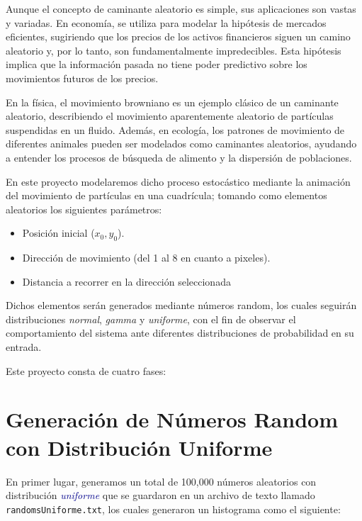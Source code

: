 \documentclass[11pt]{article} %
\begin{document}
	Aunque el concepto de caminante aleatorio es simple, sus aplicaciones son vastas y variadas. En economía, se utiliza para modelar la hipótesis de mercados eficientes, sugiriendo que los precios de los activos financieros siguen un camino aleatorio y, por lo tanto, son fundamentalmente impredecibles. Esta hipótesis implica que la información pasada no tiene poder predictivo sobre los movimientos futuros de los precios.
	
	En la física, el movimiento browniano es un ejemplo clásico de un caminante aleatorio, describiendo el movimiento aparentemente aleatorio de partículas suspendidas en un fluido. Además, en ecología, los patrones de movimiento de diferentes animales pueden ser modelados como caminantes aleatorios, ayudando a entender los procesos de búsqueda de alimento y la dispersión de poblaciones.
	
	En este proyecto modelaremos dicho proceso estocástico mediante la animación del movimiento de partículas en una cuadrícula; tomando como elementos aleatorios los siguientes parámetros:
	\begin{itemize}
		\item Posición inicial (\( x_0, y_0 \)).
		\item Dirección de movimiento (del 1 al 8 en cuanto a pixeles).
		\item Distancia a recorrer en la dirección seleccionada
	\end{itemize}
	
	Dichos elementos serán generados mediante números random, los cuales seguirán distribuciones \textit{normal}, \textit{gamma} y \textit{uniforme}, con el fin de observar el comportamiento del sistema ante diferentes distribuciones de probabilidad en su entrada.

	Este proyecto consta de cuatro fases:
	
	\newpage
	
	\section{Generación de Números Random con Distribución Uniforme}

	En primer lugar, generamos un total de 100,000 números aleatorios con distribución \textcolor{darkBlue}{\textit{uniforme}} que se guardaron en un archivo de texto llamado \texttt{randomsUniforme.txt}, los cuales generaron un histograma como el siguiente:
	
\end{document}
